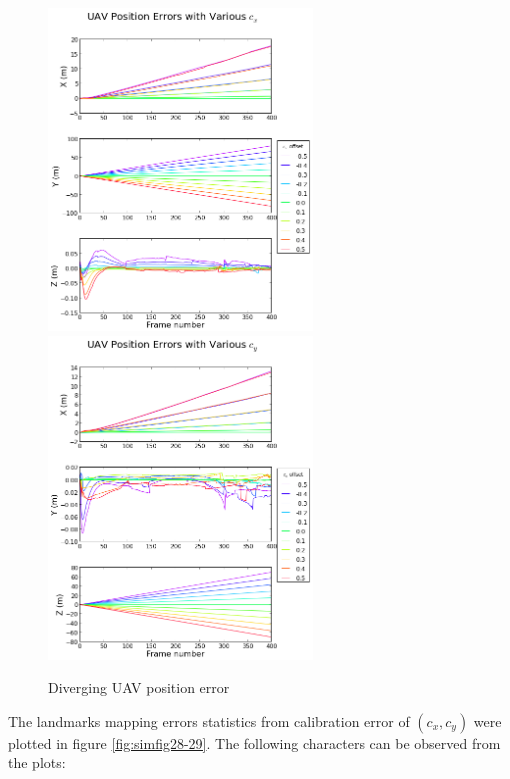 \begin{figure}[h]
  \centering
  \includegraphics[width=7cm,keepaspectratio=true]{./Figures/SimulationFigures/Figure36.png}
  \includegraphics[width=7cm,keepaspectratio=true]{./Figures/SimulationFigures/Figure37.png}
  \caption{Diverging UAV position error}
  \label{fig:simfig36-37}
\end{figure}
\FloatBarrier

The landmarks mapping errors statistics from calibration error of
$(c_{x}, c_{y})$ were plotted in figure \ref{fig:simfig28-29}. The
following characters can be observed from the plots:

